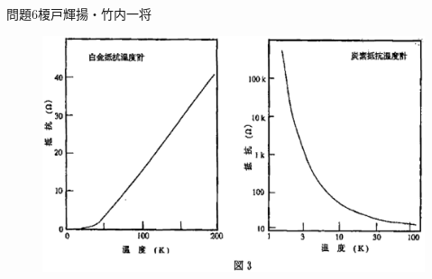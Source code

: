 \documentclass[fleqn]{jbook}
\begin{document}
\begin{question}{問題6}{榎戸輝揚・竹内一将}
\begin{figure}[htbp]
  \begin{center}
    \includegraphics[width=150mm]{2003phy6-3.eps}
  \end{center}
\end{figure}

\end{question}

\end{document}
